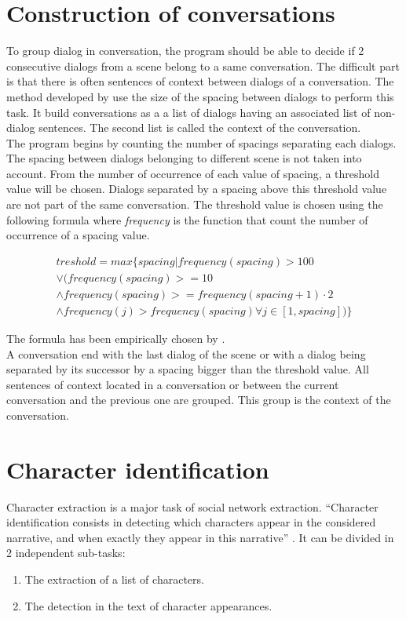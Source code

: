 \documentclass[a4paper, 12pt]{report}
\begin{document}
\section{Construction of conversations}
To group dialog in conversation, the program should be able to decide if 2 consecutive dialogs from a scene belong to a same conversation. The difficult part is that there is often sentences of context between dialogs of a conversation. The method developed by \cite{original_thesis} use the size of the spacing between dialogs to perform this task. It build conversations as a a list of dialogs having an associated list of non-dialog sentences. The second list is called the context of the conversation.\\
The program begins by counting the number of spacings separating each dialogs. The spacing between dialogs belonging to different scene is not taken into account. From the number of occurrence of each value of spacing, a threshold value will be chosen. Dialogs separated by a spacing above this threshold value are not part of the same conversation. The threshold value is chosen using the following formula where \textit{frequency} is the function that count the number of occurrence of a spacing value.

\begin{equation}
\begin{split}	
treshold = max\{spacing | frequency(spacing) > 100 \\
\vee (frequency(spacing) >= 10 \\
\wedge frequency(spacing) >= frequency(spacing + 1) \cdot 2 \\
\wedge frequency(j) > frequency(spacing) \forall j \in [1,spacing])\}
	 \end{split}
\end{equation}

The formula has been empirically chosen by \cite{original_thesis}.\\

A conversation end with the last dialog of the scene or with a dialog being separated by its successor by a spacing bigger than the threshold value. All sentences of context located in a conversation or between the current conversation and the previous one are grouped. This group is the context of the conversation.\\



\section{Character identification}
Character extraction is a major task of social network extraction. ``Character identification consists in detecting which characters appear in the considered narrative, and when exactly they appear in this narrative'' \citep{fiction}. It can be divided in 2 independent sub-tasks:
\begin{enumerate}
\item The extraction of a list of characters.
\item The detection in the text of character appearances.
\end{enumerate}
\end{document}
